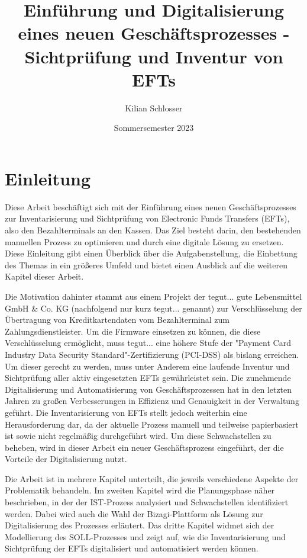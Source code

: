 \documentclass[12pt, a4paper]{article}
\title{Einführung und Digitalisierung eines neuen Geschäftsprozesses - Sichtprüfung und Inventur von EFTs}
\author{Kilian Schlosser}
\date{Sommersemester 2023}
\begin{document}
\maketitle


\tableofcontents
\newpage

\section{Einleitung}

Diese Arbeit beschäftigt sich mit der Einführung eines neuen Geschäftsprozesses zur Inventarisierung und Sichtprüfung von Electronic Funds Transfers (EFTs), also den Bezahlterminals 
an den Kassen. 
Das Ziel besteht darin, den bestehenden manuellen Prozess zu optimieren und durch eine digitale Lösung zu ersetzen. Diese Einleitung gibt einen Überblick über die 
Aufgabenstellung, die Einbettung des Themas in ein größeres Umfeld und bietet einen Ausblick auf die weiteren Kapitel dieser Arbeit.

Die Motivation dahinter stammt aus einem Projekt der tegut... gute Lebensmittel GmbH \& Co. KG (nachfolgend nur kurz tegut... genannt) zur Verschlüsselung der Übertragung von
Kreditkartendaten vom Bezahlterminal zum Zahlungsdienstleister. Um die Firmware einsetzen zu können, die diese Verschlüsselung ermöglicht, muss tegut... eine höhere Stufe der 
"Payment Card Industry Data Security Standard"-Zertifizierung (PCI-DSS) als bislang erreichen. Um dieser gerecht zu werden, muss unter Anderem eine laufende Inventur und
Sichtprüfung aller aktiv eingesetzten EFTs gewährleistet sein.
Die zunehmende Digitalisierung und Automatisierung von Geschäftsprozessen hat in den letzten Jahren zu großen Verbesserungen in Effizienz und Genauigkeit in der Verwaltung geführt.
Die Inventarisierung von EFTs stellt jedoch weiterhin eine Herausforderung dar, da der aktuelle Prozess manuell und teilweise papierbasiert ist sowie nicht regelmäßig 
durchgeführt wird. 
Um diese Schwachstellen zu beheben, wird in dieser Arbeit ein neuer Geschäftsprozess eingeführt, der die Vorteile der Digitalisierung nutzt. 

Die Arbeit ist in mehrere Kapitel unterteilt, die jeweils verschiedene Aspekte der Problematik behandeln. Im zweiten Kapitel wird die Planungsphase näher beschrieben, 
in der der IST-Prozess analysiert und Schwachstellen identifiziert werden. Dabei wird auch die Wahl der Bizagi-Plattform als Lösung zur Digitalisierung des Prozesses erläutert. 
Das dritte Kapitel widmet sich der Modellierung des SOLL-Prozesses und zeigt auf, wie die Inventarisierung und Sichtprüfung der EFTs digitalisiert und automatisiert werden 
können.
\end{document}
